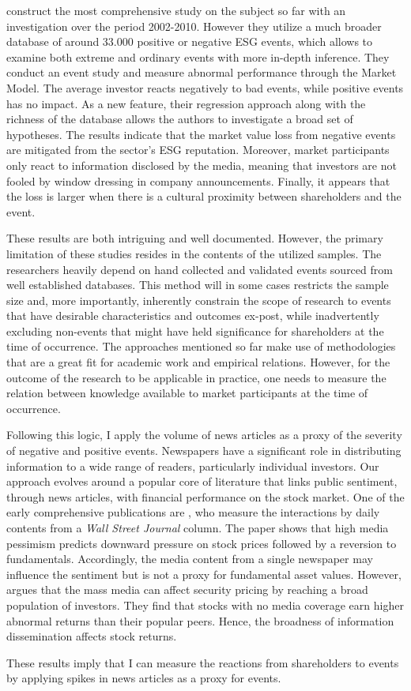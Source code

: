 \cite{Blancard_ESG_sentiment} construct the most comprehensive study on the subject so far with an investigation over the period 2002-2010. However they utilize a much broader database of around 33.000 positive or negative ESG events, which allows to examine both extreme and ordinary events with more in-depth inference. They conduct an event study and measure abnormal performance through the Market Model. The average investor reacts negatively to bad events, while positive events has no impact. As a new feature, their regression approach along with the richness of the database allows the authors to investigate a broad set of hypotheses. The results indicate that the market value loss from negative events are mitigated from the sector's ESG reputation. Moreover, market participants only react to information disclosed by the media, meaning that investors are not fooled by window dressing in company announcements. Finally, it appears that the loss is larger when there is a cultural proximity between shareholders and the event. 

These results are both intriguing and well documented. However, the primary limitation of these studies resides in the contents of the utilized samples. The researchers heavily depend on hand collected and validated events sourced from well established databases. This method will in some cases restricts the sample size and, more importantly, inherently constrain the scope of research to events that have desirable characteristics and outcomes ex-post, while inadvertently excluding non-events that might have held significance for shareholders at the time of occurrence. The approaches mentioned so far make use of methodologies that are a great fit for academic work and empirical relations. However, for the outcome of the research to be applicable in practice, one needs to measure the relation between knowledge available to market participants at the time of occurrence. 

Following this logic, I apply the volume of news articles as a proxy of the severity of negative and positive events. Newspapers have a significant role in distributing information to a wide range of readers, particularly individual investors. Our approach evolves around a popular core of literature that links public sentiment, through news articles, with financial performance on the stock market. One of the early comprehensive publications are \cite{tetlock_sentiment}, who measure the interactions by daily contents from a \textit{Wall Street Journal} column. The paper shows that high media pessimism predicts downward pressure on stock prices followed by a reversion to fundamentals. Accordingly, the media content from a single newspaper may influence the sentiment but is not a proxy for fundamental asset values. However, \cite{fang2009media} argues that the mass media can affect security pricing by reaching a broad population of investors. They find that stocks with no media coverage earn higher abnormal returns than their popular peers. Hence, the broadness of information dissemination affects stock returns. 

These results imply that I can measure the reactions from shareholders to events by applying spikes in news articles as a proxy for events. 
